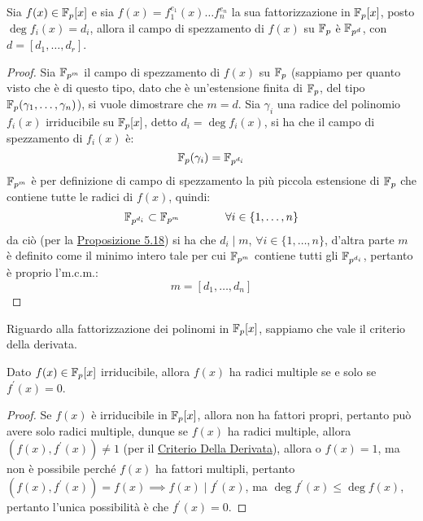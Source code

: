 \documentclass[11pt]{scrartcl}
\begin{document}
\begin{theorem}
	Sia $f(x) \in {\mathbb F}_p[x]$ e sia $f(x)=f_1^{e_1}(x)\ldots f_n^{e_n}$ la sua fattorizzazione in ${\mathbb F}_p[x]$, posto
	$\deg f_i(x) = d_i$, allora il campo di spezzamento di $f(x)$ su ${\mathbb F}_p$ è $\mathbb F_{p^d}$, con $d=[d_1,\ldots,d_r]$.
\end{theorem}

\begin{proof}
Sia $\mathbb{F}_{{p}^{m}}$ il campo di spezzamento di $f(x)$ su ${\mathbb F}_p$ (sappiamo per quanto visto che è di questo tipo, dato che 
è un'estensione finita di ${\mathbb F}_p$, del tipo ${\mathbb F}_p(\gamma_1,\ldots,\gamma_n)$), si vuole dimostrare che $m=d$. Sia $\gamma_i$ una
radice del polinomio $f_i(x)$ irriducibile su ${\mathbb F}_p[x]$, detto $d_i = \deg f_i(x)$, si ha che il campo di spezzamento di $f_i(x)$ è:
	\[ {\mathbb F}_p(\gamma_i) = \mathbb{F}_{{p}^{d_i}}
		\]
$\mathbb{F}_{{p}^{m}}$ è per definizione di campo di spezzamento la più piccola estensione di ${\mathbb F}_p$ che contiene tutte le radici di $f(x)$, quindi:
	\[ \mathbb{F}_{{p}^{d_i}} \subset \mathbb{F}_{{p}^{m}}
	\qquad\qquad\forall i \in \{1,\ldots,n\}
		\]
	da ciò (per la \hyperref[cf:5.18]{Proposizione 5.18}) si ha che $d_i \mid m$, $\forall i \in \{1,\ldots,n\}$, d'altra parte $m$ è definito
	come il minimo intero tale per cui $\mathbb{F}_{{p}^{m}}$ contiene tutti gli $\mathbb{F}_{{p}^{d_i}}$, pertanto è proprio l'm.c.m.:
		\[ m = [d_1,\ldots,d_n]
			\]
\end{proof}

\begin{remark}
	Riguardo alla fattorizzazione dei polinomi in ${\mathbb F}_p[x]$, sappiamo che vale il criterio della derivata.
\end{remark}

\begin{corollary}
	Dato $f(x) \in {\mathbb F}_p[x]$ irriducibile, allora $f(x)$ ha radici multiple se e solo se $f^{\prime}(x) = 0$.
\end{corollary}

\begin{proof}
	Se $f(x)$ è irriducibile in ${\mathbb F}_p[x]$, allora non ha fattori propri, pertanto può avere solo radici multiple, dunque se $f(x)$ ha radici multiple,
	allora $(f(x),f^{\prime}(x)) \ne 1$ (per il \hyperref[p:der]{Criterio Della Derivata}), allora o $f(x) = 1$, ma non è possibile perché $f(x)$ ha fattori multipli,
	pertanto $(f(x),f^{\prime}(x)) = f(x) \implies f(x) \mid f^{\prime}(x)$, ma $\deg f^{\prime}(x) \leq \deg f(x)$, pertanto l'unica possibilità è che $f^{\prime}(x)=0$.
\end{proof}
\end{document}
